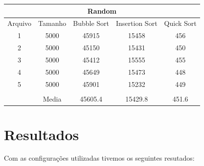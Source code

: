 \documentclass[12pt]{article}
\begin{document}
\hspace{3cm}

\begin{tabular}{|c|c|c|c|c|}
\hline 
\multicolumn{5}{|c|}{Random} \\ 
\hline 
Arquivo & Tamanho & Bubble Sort & Insertion Sort & Quick Sort \\ 
\hline 
1 & 5000 & 45915 & 15458 & 456 \\ 
\hline 
2 & 5000 & 45150 & 15431 & 450 \\ 
\hline 
3 & 5000 & 45412 & 15555 & 455 \\ 
\hline 
4 & 5000 & 45649 & 15473 & 448 \\ 
\hline 
5 & 5000 & 45901 & 15232 & 449 \\ 
\hline 
\multicolumn{5}{|c|}{}\\ 
\hline 
 & Media & 45605.4 & 15429.8 & 451.6 \\ 
\hline 

\end{tabular} 

\newpage 
\section{Resultados}
 Com as configurações utilizadas tivemos os seguintes resutados:
\end{document}
